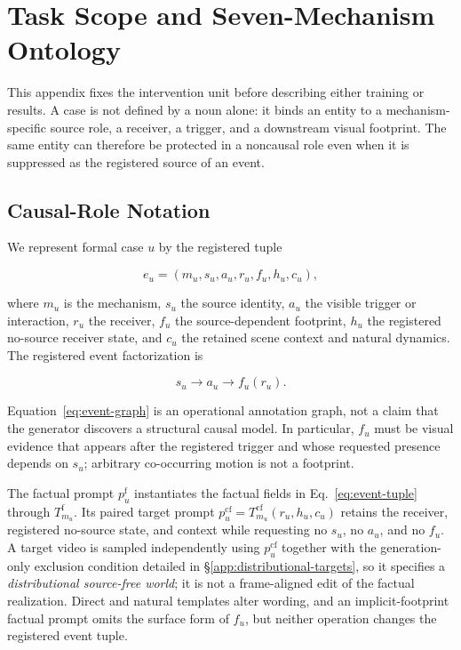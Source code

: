 \section{Task Scope and Seven-Mechanism Ontology}
\label{app:task-ontology}

This appendix fixes the intervention unit before describing either training or
results.  A case is not defined by a noun alone: it binds an entity to a
mechanism-specific source role, a receiver, a trigger, and a downstream visual
footprint.  The same entity can therefore be protected in a noncausal role even
when it is suppressed as the registered source of an event.

\subsection{Causal-Role Notation}
\label{app:causal-role-notation}

We represent formal case \(u\) by the registered tuple

\begin{equation}
  e_u=(m_u,s_u,a_u,r_u,f_u,h_u,c_u),
  \label{eq:event-tuple}
\end{equation}

where \(m_u\) is the mechanism, \(s_u\) the source identity, \(a_u\) the
visible trigger or interaction, \(r_u\) the receiver, \(f_u\) the
source-dependent footprint, \(h_u\) the registered no-source receiver state,
and \(c_u\) the retained scene context and natural dynamics. The
registered event factorization is

\begin{equation}
  s_u \longrightarrow a_u \longrightarrow f_u(r_u).
  \label{eq:event-graph}
\end{equation}

Equation~\ref{eq:event-graph} is an operational annotation graph, not a claim
that the generator discovers a structural causal model.  In particular,
\(f_u\) must be visual evidence that appears after the registered trigger
and whose requested presence depends on \(s_u\); arbitrary co-occurring motion
is not a footprint.

The factual prompt \(p_u^{\mathrm f}\) instantiates the factual fields in
Eq.~\ref{eq:event-tuple} through \(T_{m_u}^{\mathrm f}\). Its paired target
prompt \(p_u^{\mathrm{cf}}=T_{m_u}^{\mathrm{cf}}(r_u,h_u,c_u)\) retains the
receiver, registered no-source state, and context while requesting no
\(s_u\), no \(a_u\), and no \(f_u\). A target
video is sampled independently using \(p_u^{\mathrm{cf}}\) together with the
generation-only exclusion condition detailed in
\S\ref{app:distributional-targets}, so it specifies a
\emph{distributional source-free world}; it is not a frame-aligned edit of the
factual realization. Direct and natural templates alter wording, and an
implicit-footprint factual prompt omits the surface form of \(f_u\), but
neither operation changes the registered event tuple.

